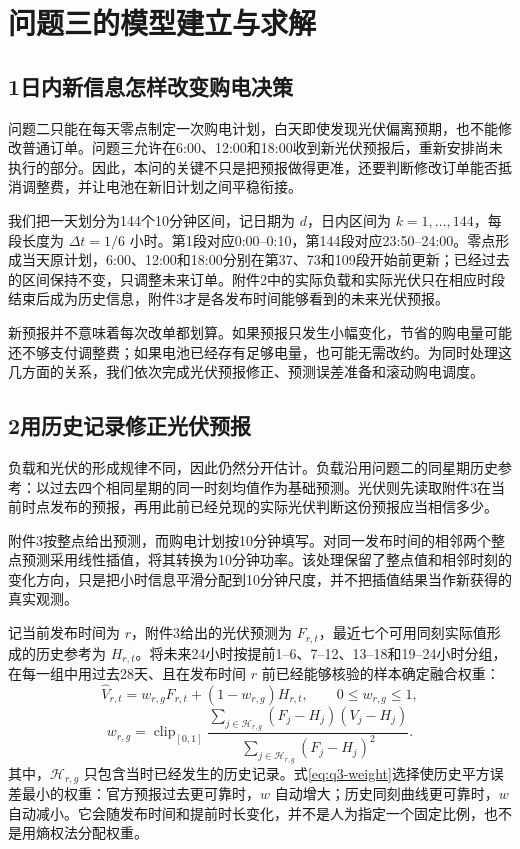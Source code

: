 \documentclass[11pt,a4paper]{article}
\begin{document}
\section*{问题三的模型建立与求解}
\subsection*{1\quad 日内新信息怎样改变购电决策}

问题二只能在每天零点制定一次购电计划，白天即使发现光伏偏离预期，也不能修改普通订单。问题三允许在6:00、12:00和18:00收到新光伏预报后，重新安排尚未执行的部分。因此，本问的关键不只是把预报做得更准，还要判断修改订单能否抵消调整费，并让电池在新旧计划之间平稳衔接。

我们把一天划分为144个10分钟区间，记日期为 $d$，日内区间为 $k=1,\ldots,144$，每段长度为 $\Delta t=1/6$ 小时。第1段对应0:00--0:10，第144段对应23:50--24:00。零点形成当天原计划，6:00、12:00和18:00分别在第37、73和109段开始前更新；已经过去的区间保持不变，只调整未来订单。附件2中的实际负载和实际光伏只在相应时段结束后成为历史信息，附件3才是各发布时间能够看到的未来光伏预报。

新预报并不意味着每次改单都划算。如果预报只发生小幅变化，节省的购电量可能还不够支付调整费；如果电池已经存有足够电量，也可能无需改约。为同时处理这几方面的关系，我们依次完成光伏预报修正、预测误差准备和滚动购电调度。

\subsection*{2\quad 用历史记录修正光伏预报}

负载和光伏的形成规律不同，因此仍然分开估计。负载沿用问题二的同星期历史参考：以过去四个相同星期的同一时刻均值作为基础预测。光伏则先读取附件3在当前时点发布的预报，再用此前已经兑现的实际光伏判断这份预报应当相信多少。

附件3按整点给出预测，而购电计划按10分钟填写。对同一发布时间的相邻两个整点预测采用线性插值，将其转换为10分钟功率。该处理保留了整点值和相邻时刻的变化方向，只是把小时信息平滑分配到10分钟尺度，并不把插值结果当作新获得的真实观测。

记当前发布时间为 $r$，附件3给出的光伏预测为 $F_{r,t}$，最近七个可用同刻实际值形成的历史参考为 $H_{r,t}$。将未来24小时按提前1--6、7--12、13--18和19--24小时分组，在每一组中用过去28天、且在发布时间 $r$ 前已经能够核验的样本确定融合权重：
\begin{equation}
\widehat V_{r,t}=w_{r,g}F_{r,t}+(1-w_{r,g})H_{r,t},
\qquad 0\le w_{r,g}\le1,
\label{eq:q3-fusion}
\end{equation}
\begin{equation}
w_{r,g}=\operatorname{clip}_{[0,1]}
\frac{\sum_{j\in\mathcal H_{r,g}}(F_j-H_j)(V_j-H_j)}
{\sum_{j\in\mathcal H_{r,g}}(F_j-H_j)^2}.
\label{eq:q3-weight}
\end{equation}
其中，$\mathcal H_{r,g}$ 只包含当时已经发生的历史记录。式\eqref{eq:q3-weight}选择使历史平方误差最小的权重：官方预报过去更可靠时，$w$ 自动增大；历史同刻曲线更可靠时，$w$ 自动减小。它会随发布时间和提前时长变化，并不是人为指定一个固定比例，也不是用熵权法分配权重。
\end{document}
